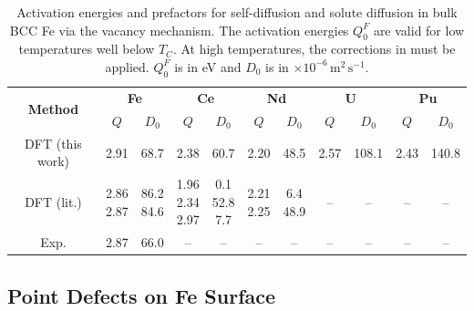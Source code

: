 \documentclass[preprint,12pt]{elsarticle}
\begin{document}
\begin{table}[!ht]
    \centering
    \caption{Activation energies and prefactors for self-diffusion and solute diffusion in bulk BCC Fe via the vacancy mechanism. The activation energies $Q_0^F$ are valid for low temperatures well below $T_C$. At high temperatures, the corrections in  must be applied. $Q_0^F$ is in eV and $D_0$ is in $\times 10^{-6}\,\mathrm{m^2\,s^{-1}}$.}
    \label{tab:activation_energies}
    \footnotesize
    \setlength{\tabcolsep}{3pt}
    \renewcommand{\arraystretch}{1.15}
    \begin{tabular}{|c|cc|cc|cc|cc|cc|}
    \hline
    \multirow{2}{*}{\textbf{Method}} 
    & \multicolumn{2}{c|}{\textbf{Fe}} 
    & \multicolumn{2}{c|}{\textbf{Ce}} 
    & \multicolumn{2}{c|}{\textbf{Nd}} 
    & \multicolumn{2}{c|}{\textbf{U}} 
    & \multicolumn{2}{c|}{\textbf{Pu}} \\
    \cline{2-11}
    & $Q$ & $D_0$ 
    & $Q$ & $D_0$ 
    & $Q$ & $D_0$ 
    & $Q$ & $D_0$ 
    & $Q$ & $D_0$ \\
    \hline
    DFT (this work)
    & 2.91 & 68.7
    & 2.38 & 60.7
    & 2.20 & 48.5
    & 2.57 & 108.1
    & 2.43 & 140.8 \\
    \hline
    DFT (lit.)
    & \shortstack{2.86 \cite{ke2025diffusion} \\ 2.87 \cite{sandberg2015modeling}} 
    & \shortstack{86.2 \cite{ke2025diffusion} \\ 84.6 \cite{sandberg2015modeling}}
    & \shortstack{1.96 \cite{yang_significant_2023} \\ 2.34 \cite{ke2025diffusion} \\ 2.97 \cite{GAO2016316}}
    & \shortstack{0.1 \cite{yang_significant_2023} \\ 52.8 \cite{ke2025diffusion} \\ 7.7 \cite{GAO2016316}}
    & \shortstack{2.21 \cite{yang_significant_2023} \\ 2.25 \cite{ke2025diffusion}}
    & \shortstack{6.4 \cite{yang_significant_2023} \\ 48.9 \cite{ke2025diffusion}}
    & -- & --
    & -- & -- \\
    \hline
    Exp.
    & 2.87 \cite{lubbehusen1990self} 
    & 66.0 \cite{lubbehusen1990self}
    & -- & --
    & -- & --
    & -- & --
    & -- & -- \\
    \hline
    \end{tabular}
\end{table}

\FloatBarrier
\subsection{Point Defects on Fe Surface}
\end{document}
